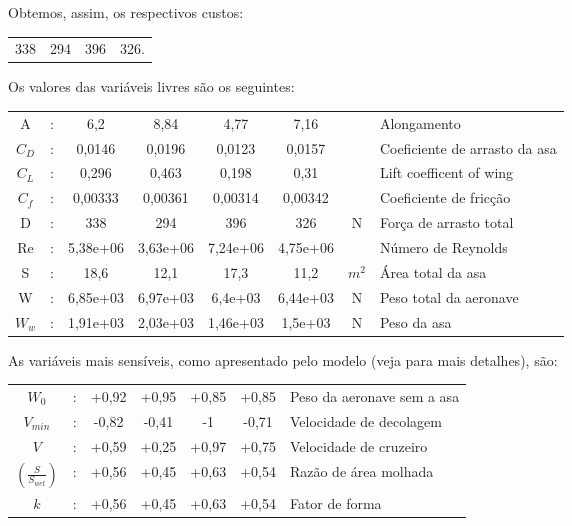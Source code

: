 \documentclass{article}
\begin{document}
Obtemos, assim, os respectivos custos:

\begin{tabular}{c c c c}
  338 & 294 & 396 & 326.
\end{tabular}

Os valores das variáveis livres são os seguintes:

\begin{tabular}{|c c c c c c c l|}
  \hline
  A & : & 6,2 & 8,84 & 4,77 & 7,16 & & Alongamento \\ $C_D$ & : &
  0,0146 & 0,0196 & 0,0123 & 0,0157 & & Coeficiente de arrasto da asa
  \\ $C_L$ & : & 0,296 & 0,463 & 0,198 & 0,31 & & Lift coefficent of
  wing \\ $C_f$ & : & 0,00333 & 0,00361 & 0,00314 & 0,00342 & &
  Coeficiente de fricção \\ D & : & 338 & 294 & 396 & 326 & N & Força
  de arrasto total \\ Re & : & 5,38e+06 & 3,63e+06 & 7,24e+06 &
  4,75e+06 & & Número de Reynolds \\ S & : & 18,6 & 12,1 & 17,3 & 11,2
  & $m^2$ & Área total da asa \\ W & : & 6,85e+03 & 6,97e+03 & 6,4e+03
  & 6,44e+03 & N & Peso total da aeronave \\ $W_w$ & : & 1,91e+03 &
                                                                    2,03e+03 & 1,46e+03 & 1,5e+03 & N & Peso da asa \\
  \hline
\end{tabular}

As variáveis mais sensíveis, como apresentado pelo modelo (veja
\cite{gpkit} para mais detalhes), são:

\begin{tabular}{|c c c c c c l|}
  \hline
  $ W_0$ &: & +0,92 & +0,95 & +0,85 & +0,85 & Peso da aeronave sem a asa
  \\ $ V_{min}$ &: & -0,82 & -0,41 & -1 & -0,71 & Velocidade de
  decolagem \\ $ V$ &: & +0,59 & +0,25 & +0,97 & +0,75 & Velocidade de
  cruzeiro \\ $(\frac{S}{S_{wet}})$ &: & +0,56 & +0,45 & +0,63 & +0,54
  & Razão de área molhada \\ $ k$ &: & +0,56 & +0,45 & +0,63 & +0,54 &
                                                                       Fator de forma \\
  \hline
\end{tabular}
\end{document}
